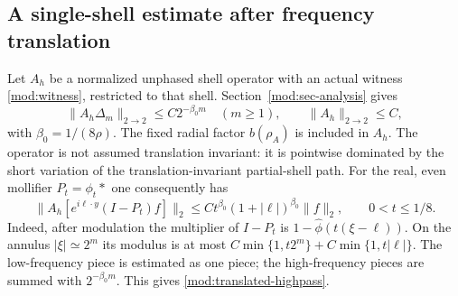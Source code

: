 \documentclass[11pt]{article}
\numberwithin{equation}{section}
\theoremstyle{remark}
\theoremstyle{definition}
\begin{document}
\subsection{A single-shell estimate after frequency translation}
Let $A_h$ be a normalized unphased shell operator with an actual witness
\eqref{mod:witness}, restricted to that shell. Section~\ref{mod:sec-analysis}
gives
\[
 \|A_h\Delta_m\|_{2\to2}\le C2^{-\beta_0m}\quad(m\ge1),
 \qquad \|A_h\|_{2\to2}\le C,
\]
with $\beta_0=1/(8\rho)$. The fixed radial factor $b(\rho_A)$ is included in $A_h$. The operator is not
assumed translation invariant: it is pointwise dominated by the short
variation of the translation-invariant partial-shell path.
For the real, even mollifier $P_t=\phi_t*$ one consequently has
\begin{equation}\label{mod:translated-highpass}
 \|A_h[e^{i\ell\cdot y}(I-P_t)f]\|_2
 \le Ct^{\beta_0}(1+|\ell|)^{\beta_0}\|f\|_2,
 \qquad0<t\le1/8.
\end{equation}
Indeed, after modulation the multiplier of $I-P_t$ is
$1-\widehat\phi(t(\xi-\ell))$. On the annulus $|\xi|\simeq2^m$ its
modulus is at most
$C\min\{1,t2^m\}+C\min\{1,t|\ell|\}$.
The low-frequency piece is estimated as one piece; the high-frequency
pieces are summed with $2^{-\beta_0m}$. This gives
\eqref{mod:translated-highpass}.
\end{document}
